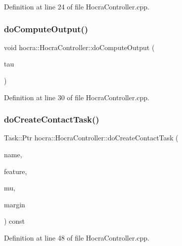 Definition at line 24 of file Hocra\+Controller.\+cpp.

\hypertarget{classhocra_1_1HocraController_a6308767c1f7c9110f030ea44e05e9862}{}\label{classhocra_1_1HocraController_a6308767c1f7c9110f030ea44e05e9862} 
\subsubsection{\texorpdfstring{do\+Compute\+Output()}{doComputeOutput()}}
{\footnotesize\ttfamily void hocra\+::\+Hocra\+Controller\+::do\+Compute\+Output (\begin{DoxyParamCaption}\item[{Vector\+Xd \&}]{tau }\end{DoxyParamCaption})\hspace{0.3cm}{\ttfamily [virtual]}}



Definition at line 30 of file Hocra\+Controller.\+cpp.

\hypertarget{classhocra_1_1HocraController_af300fdf6fb442e4313a472a127fdebef}{}\label{classhocra_1_1HocraController_af300fdf6fb442e4313a472a127fdebef} 
\subsubsection{\texorpdfstring{do\+Create\+Contact\+Task()}{doCreateContactTask()}}
{\footnotesize\ttfamily Task\+::\+Ptr hocra\+::\+Hocra\+Controller\+::do\+Create\+Contact\+Task (\begin{DoxyParamCaption}\item[{const std\+::string \&}]{name,  }\item[{ocra\+::\+Point\+Contact\+Feature\+::\+Ptr}]{feature,  }\item[{double}]{mu,  }\item[{double}]{margin }\end{DoxyParamCaption}) const}



Definition at line 48 of file Hocra\+Controller.\+cpp.

\hypertarget{classhocra_1_1HocraController_a3e308f54d5b535a67a51d60454ea35b0}{}\label{classhocra_1_1HocraController_a3e308f54d5b535a67a51d60454ea35b0} 
